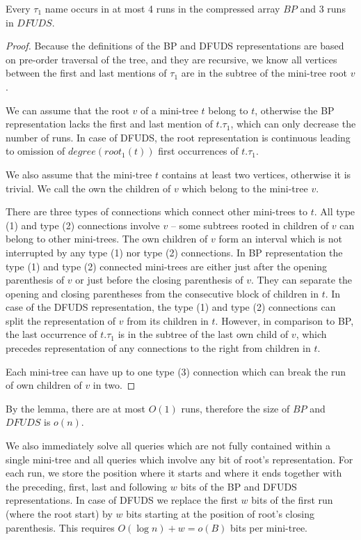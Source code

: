 \begin{lemma}\label{l:usr-runs}
	Every $\tau_1$ name occurs in at most 4 runs in the compressed array $BP$ and 3 runs in $DFUDS$.
\end{lemma}
\begin{proof}
	Because the definitions of the BP and DFUDS representations are based on pre-order traversal of the tree, and they are recursive, we know all vertices between the first and last mentions of $\tau_1$ are in the subtree of the mini-tree root $v$.
	
	We can assume that the root $v$ of a mini-tree $t$ belong to $t$, otherwise the BP representation lacks the first and last mention of $t.\tau_1$, which can only decrease the number of runs.
	In case of DFUDS, the root representation is continuous leading to omission of $degree(root_1(t))$ first occurrences of $t.\tau_1$.
	
	We also assume that the mini-tree $t$ contains at least two vertices, otherwise it is trivial.
	We call the own the children of $v$ which belong to the mini-tree $v$.
	
	There are three types of connections which connect other mini-trees to $t$.
	All type (1) and type (2) connections involve $v$ -- some subtrees rooted in children of $v$ can belong to other mini-trees.
	The own children of $v$ form an interval which is not interrupted by any type (1) nor type (2) connections.
	In BP representation the type (1) and type (2) connected mini-trees are either just after the opening parenthesis of $v$ or just before the closing parenthesis of $v$.
	They can separate the opening and closing parentheses from the consecutive block of children in $t$.
	In case of the DFUDS representation, the type (1) and type (2) connections can split the representation of $v$ from its children in $t$.
	However, in comparison to BP, the last occurrence of $t.\tau_1$ is in the subtree of the last own child of $v$, which precedes representation of any connections to the right from children in $t$.
	
	Each mini-tree can have up to one type (3) connection which can break the run of own children of $v$ in two.
\end{proof}

By the lemma, there are at most $O(1)$ runs, therefore the size of $BP$ and $DFUDS$ is $o(n)$.

We also immediately solve all queries which are not fully contained within a single mini-tree and all queries which involve any bit of root's representation.
For each run, we store the position where it starts and where it ends together with the preceding, first, last and following $w$ bits of the BP and DFUDS representations.
In case of DFUDS we replace the first $w$ bits of the first run (where the root start) by $w$ bits starting at the position of root's closing parenthesis.
This requires $O(\log n) + w = o(B)$ bits per mini-tree.


